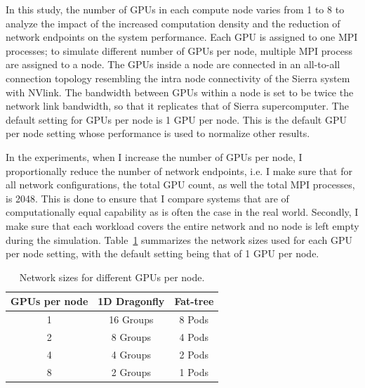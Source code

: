 
\vspace{0.08in}
In this study, the number of GPUs in each compute node varies from 1 to
8 to analyze the impact of the increased computation density and the reduction
of network endpoints on the system performance. Each GPU is assigned
to one MPI processes; to simulate different number of GPUs
per node, multiple MPI process are assigned to a node.
The GPUs inside a node are connected in an all-to-all connection topology resembling the intra node connectivity of the Sierra system with NVlink.
The bandwidth between GPUs within a node
is set to be twice the network link bandwidth, so that it replicates that of Sierra supercomputer.
The default setting for GPUs per node is 1 GPU per node. This is the default
GPU per node setting whose performance is used to normalize other results. 

In the experiments, when I increase the number of GPUs per node, I
proportionally reduce the number of network endpoints, i.e. I make sure that
for all network configurations, the total GPU count, as well the total MPI
  processes, is 2048. This is done
  to ensure that I compare systems that are of computationally equal capability
  as is often the case in the real world. Secondly, I make sure that each
  workload covers the entire network and no node is left empty during the
  simulation. 
  Table~\ref{table:configs} summarizes the network sizes used for each GPU
  per node setting, with the default setting being that of 1 GPU per node.  

\begin{table}[h]
       \centering
\caption{Network sizes for different GPUs per node.}
        \vspace{-1em}
        \begin{tabular}{ccc} \toprule
        \textbf{GPUs per node} & \textbf{1D Dragonfly} & \textbf{Fat-tree}\\ \midrule 
        1 & 16 Groups & 
        8 Pods \\
        
        2 &
        8 Groups & 
        4 Pods \\
        
        4 & 4 Groups & 
        2 Pods \\
        
        8 & 
        2 Groups & 
        1 Pods\\ \bottomrule
        \end{tabular}
\label{table:configs}
\end{table}

